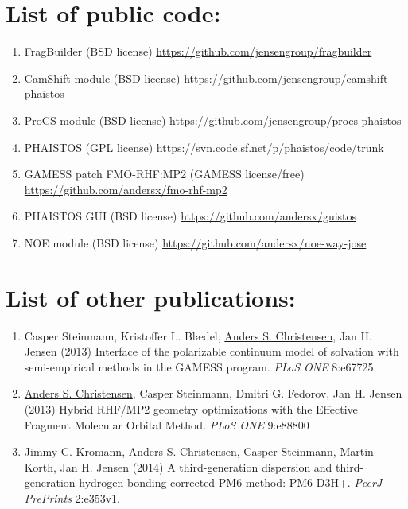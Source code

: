 \section*{List of public code:}
\begin{enumerate}
    \item FragBuilder (BSD license) \url{https://github.com/jensengroup/fragbuilder}
    \item CamShift module (BSD license) \url{https://github.com/jensengroup/camshift-phaistos}
    \item ProCS module (BSD license) \url{https://github.com/jensengroup/procs-phaistos}
    \item PHAISTOS (GPL license) \url{https://svn.code.sf.net/p/phaistos/code/trunk}
    \item GAMESS patch FMO-RHF:MP2 (GAMESS license/free) \url{https://github.com/andersx/fmo-rhf-mp2}
    \item PHAISTOS GUI (BSD license) \url{https://github.com/andersx/guistos}
    \item NOE module (BSD license) \url{https://github.com/andersx/noe-way-jose}
\end{enumerate}
\clearpage
\section*{List of other publications:}
\begin{enumerate}
    \item Casper Steinmann, Kristoffer L. Blædel, \underline{Anders S. Christensen}, Jan H. Jensen (2013) Interface of the polarizable continuum model of solvation with semi-empirical methods in the GAMESS program. \textit{PLoS ONE} 8:e67725.
    \item \underline{Anders S. Christensen}, Casper Steinmann, Dmitri G. Fedorov, Jan H. Jensen (2013) Hybrid RHF/MP2 geometry optimizations with the Effective Fragment Molecular Orbital Method. \textit{PLoS ONE} 9:e88800
    \item Jimmy C. Kromann, \underline{Anders S. Christensen}, Casper Steinmann, Martin Korth, Jan H. Jensen (2014) A third-generation dispersion and third-generation hydrogen bonding corrected PM6 method: PM6-D3H+. \textit{PeerJ PrePrints} 2:e353v1.
\end{enumerate}

